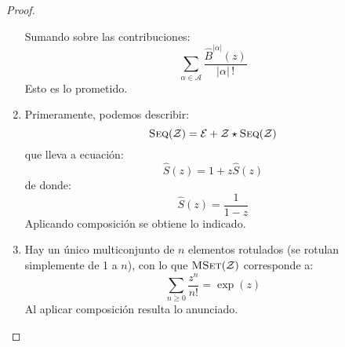 \documentclass[english, spanish, fleqn, 10pt]{article}
\numberwithin{equation}{section}
\theoremstyle{definition}
\DeclareMathOperator{\Seq}{\textsc{Seq}}
\DeclareMathOperator{\MSet}{\textsc{MSet}}
\begin{document}
\begin{proof}
\begin{enumerate}
\begin{equation*}
			\end{equation*}
			Sumando sobre las contribuciones:
			\begin{equation*}
			\sum_{\alpha \in \mathcal{A}}
			\frac{\widehat{B}^{\lvert \alpha \rvert}(z)}
			{\lvert \alpha \rvert \, !}
			\end{equation*}
			Esto es lo prometido.
			\item %
			Primeramente,
			podemos describir:
			\begin{equation*}
			\Seq(\mathcal{Z})
			= \mathcal{E} + \mathcal{Z} \star \Seq(\mathcal{Z})
			\end{equation*}
			que lleva a ecuación:
			\begin{equation*}
			\widehat{S}(z)
			= 1 + z \widehat{S}(z)
			\end{equation*}
			de donde:
			\begin{equation*}
			\widehat{S}(z)
			= \frac{1}{1 - z}
			\end{equation*}
			Aplicando composición se obtiene lo indicado.
			\item %
			Hay un único multiconjunto de \(n\) elementos rotulados
			(se rotulan simplemente de 1 a  \(n\)),
			con lo que \(\MSet(\mathcal{Z})\) corresponde a:
			\begin{equation*}
			\sum_{n \ge 0} \frac{z^n}{n!}
			= \exp(z)
			\end{equation*}
			Al aplicar composición resulta lo anunciado.
			

\end{enumerate}
\end{proof}
\end{document}

